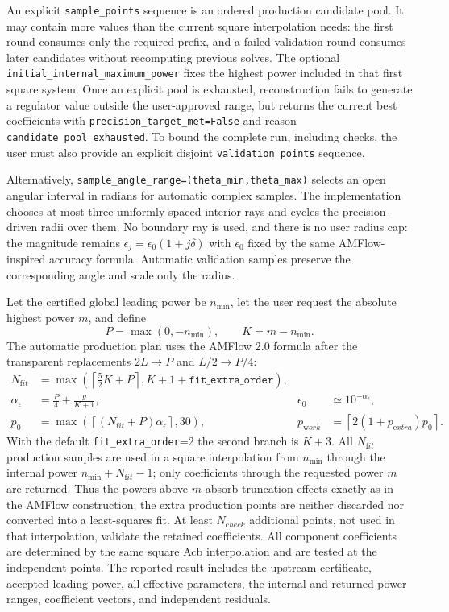 \documentclass[11pt]{article}
\newcommand{\eps}{\epsilon}
\begin{document}
An explicit \texttt{sample\_points} sequence is an ordered production candidate pool.  It may
contain more values than the current square interpolation needs: the first round consumes only
the required prefix, and a failed validation round consumes later candidates without recomputing
previous solves.  The optional \texttt{initial\_internal\_maximum\_power} fixes the highest power
included in that first square system.  Once an explicit pool is exhausted, reconstruction fails
to generate a regulator value outside the user-approved range, but returns the current best
coefficients with \texttt{precision\_target\_met=False} and reason
\texttt{candidate\_pool\_exhausted}.  To bound the complete run, including checks, the user must
also provide an explicit disjoint \texttt{validation\_points} sequence.

Alternatively, \texttt{sample\_angle\_range=(theta\_min,theta\_max)} selects an open angular
interval in radians for automatic complex samples.  The implementation chooses at most three
uniformly spaced interior rays and cycles the precision-driven radii over them.  No boundary ray
is used, and there is no user radius cap: the magnitude remains
$\epsilon_j=\epsilon_0(1+j\delta)$ with $\epsilon_0$ fixed by the same AMFlow-inspired accuracy
formula.  Automatic validation samples preserve the corresponding angle and scale only the radius.

Let the certified global leading power be $n_{\min}$, let the user request the absolute
highest power $m$, and define
\begin{equation}
  P=\max(0,-n_{\min}),\qquad K=m-n_{\min}.
\end{equation}
The automatic production plan uses the AMFlow 2.0 formula after the transparent replacements
$2L\to P$ and $L/2\to P/4$:
\begin{align}
 N_{\mathrm fit}&=
 \max\!\left(\left\lceil\frac52K+P\right\rceil,K+1+\texttt{fit\_extra\_order}\right),\\
 \alpha_\eps&=\frac P4+\frac{g}{K+1},
 &\eps_0&\simeq10^{-\alpha_\eps},\\
 p_0&=\max\left(\left\lceil(N_{\mathrm fit}+P)\alpha_\eps\right\rceil,30\right),
 &p_{\mathrm work}&=\left\lceil2(1+p_{\mathrm extra})p_0\right\rceil.
  \label{eq:ndes-series-reconstruction-default}
\end{align}
With the default \texttt{fit\_extra\_order}=2 the second branch is $K+3$.  All
$N_{\mathrm fit}$ production samples are used in a square interpolation from
$n_{\min}$ through the internal power
$n_{\min}+N_{\mathrm fit}-1$; only coefficients through the requested power $m$ are returned.
Thus the powers above $m$ absorb truncation effects exactly as in the AMFlow construction;
the extra production points are neither discarded nor converted into a least-squares fit.
At least $N_{\mathrm check}$ additional points, not used in that interpolation, validate the
retained coefficients.  All component coefficients are determined by the same square Acb
interpolation and are tested at the independent points.  The reported result includes the
upstream certificate, accepted leading power, all effective parameters, the internal and returned
power ranges, coefficient vectors, and independent residuals.
\end{document}
